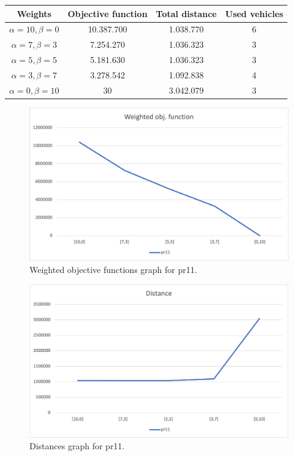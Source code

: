 {
\renewcommand{\arraystretch}{2}
\begin{longtable}[h]{| c | c | c | c |}
    \hline
    \textbf{Weights} & \textbf{Objective function} & \textbf{Total distance} & \textbf{Used vehicles} \\
    \hline
    \endhead
    $\alpha = 10, \beta = 0$ & 10.387.700 & 1.038.770 & 6 \\
    \hline
    $\alpha = 7, \beta = 3$  &  7.254.270 & 1.036.323 & 3 \\
    \hline
    $\alpha = 5, \beta = 5$  &  5.181.630 & 1.036.323 & 3 \\
    \hline
    $\alpha = 3, \beta = 7$  &  3.278.542 & 1.092.838 & 4 \\
    \hline
    $\alpha = 0, \beta = 10$ &         30 & 3.042.079 & 3 \\
    \hline
\end{longtable}
}
\begin{figure}[H]
    \centering
    \includegraphics[width=1.0\columnwidth]{../graphs/pr11-wobjf.png}
    \caption{Weighted objective functions graph for pr11.}
\end{figure}

\begin{figure}[H]
    \centering
    \includegraphics[width=1.0\columnwidth]{../graphs/pr11-distance.png}
    \caption{Distances graph for pr11.}
\end{figure}

